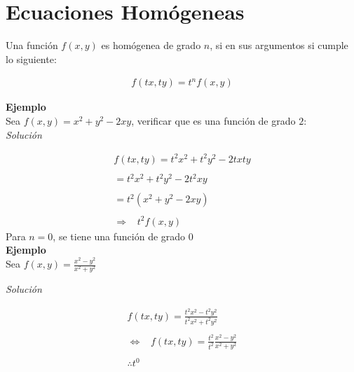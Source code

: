 \chapter{Ecuaciones Homógeneas}
Una función \(\displaystyle f(x,y)\) es homógenea de grado \(\displaystyle n\), si en sus argumentos si cumple lo siguiente:

\begin{equation*}
    \begin{gathered}
        f(tx,ty)=t^{n}f(x,y)
    \end{gathered}
\end{equation*}

\textbf{Ejemplo}\\

Sea \(\displaystyle f(x,y)=x^{2}+y^{2}-2xy\), verificar que es una función de grado \(\displaystyle 2\):\\

\textit{Solución}

\begin{equation*}
    \begin{gathered}
        f(tx,ty)=t^{2}x^{2}+t^{2}y^{2}-2txty\\\\
        =t^{2}x^{2}+t^{2}y^{2}-2t^{2}xy\\\\
        =t^{2}(x^{2}+y^{2}-2xy)\\\\
        \Rightarrow\;\;\;t^{2}f(x,y)
    \end{gathered}
\end{equation*}
Para \(\displaystyle n=0\), se tiene una función de grado \(\displaystyle 0\)\\

\textbf{Ejemplo}\\

Sea \(\displaystyle f(x,y)=\frac{x^{2}-y^{2}}{x^{2}+y^{2}}\)

\textit{Solución}

\begin{equation*}
    \begin{gathered}
        f(tx,ty)=\frac{t^{2}x^{2}-t^{2}y^{2}}{t^{2}x^{2}+t^{2}y^{2}}\\\\
        \Leftrightarrow\;\;\;f(tx,ty)=\frac{t^{2}}{t^{2}}\frac{x^{2}-y^{2}}{x^{2}+y^{2}}\\\\
        \therefore t^{0}
    \end{gathered}
\end{equation*}

